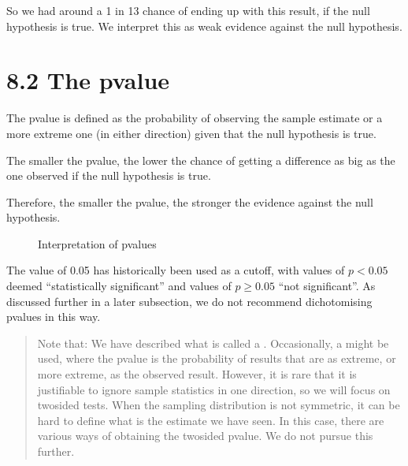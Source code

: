 \documentclass[letterpaper,10pt,english]{jupyterBook}
\let\sphinxpxdimen\pdfpxdimen\else\newdimen\sphinxpxdimen
\begin{document}
\sphinxAtStartPar
So we had around a 1 in 13 chance of ending up with this result, if the null hypothesis is true. We interpret this as  weak evidence against the null hypothesis.


\section{8.2 The p\sphinxhyphen{}value}
\label{\detokenize{08.c. Frequentist II:the-p-value}}\label{\detokenize{08.c. Frequentist II::doc}}
\sphinxAtStartPar
The p\sphinxhyphen{}value is defined as the probability of observing the sample estimate or a more extreme one (in either direction) given that the null hypothesis is true.

\sphinxAtStartPar
The smaller the p\sphinxhyphen{}value, the lower the chance of getting a difference as big  as the one observed if the null hypothesis is true.

\sphinxAtStartPar
Therefore, the smaller the p\sphinxhyphen{}value,  the stronger the evidence against the null hypothesis.

\begin{figure}[htbp]
\centering
\capstart

\noindent\sphinxincludegraphics[height=400\sphinxpxdimen]{{pvalues}.png}
\caption{Interpretation of p\sphinxhyphen{}values }\label{\detokenize{08.c. Frequentist II:inference}}\end{figure}

\sphinxAtStartPar
The value of 0.05 has historically been used as a cut\sphinxhyphen{}off, with values of \(p<0.05\) deemed “statistically significant” and values of \(p\geq 0.05\) “not significant”. As discussed further in a later sub\sphinxhyphen{}section, we do not recommend dichotomising p\sphinxhyphen{}values in this way.
\begin{quote}

\sphinxAtStartPar
Note that: \sphinxhyphen{} We have described what is called a . Occasionally, a  might be used, where the p\sphinxhyphen{}value is the probability of results that are as extreme, or more extreme,  as the observed result. However, it is rare that it is justifiable to ignore sample statistics in one direction, so we will focus on two\sphinxhyphen{}sided tests.
 \sphinxhyphen{} When the sampling distribution is not symmetric, it can be hard to define what is  the estimate we have seen. In this case, there are various ways of obtaining the two\sphinxhyphen{}sided p\sphinxhyphen{}value. We do not pursue this further.
\end{quote}
\end{document}
